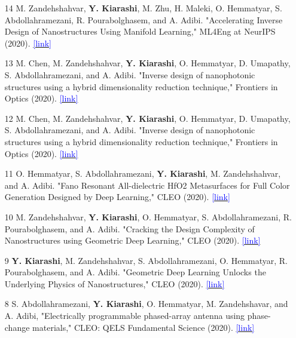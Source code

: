 \documentclass[margin, line]{res}
\newenvironment{list1}{
  \begin{list}{\ding{113}}{%
      \setlength{\itemsep}{0in}
      \setlength{\parsep}{0in} \setlength{\parskip}{0in}
      \setlength{\topsep}{0in} \setlength{\partopsep}{0in} 
      \setlength{\leftmargin}{0.17in}}}{\end{list}}
\begin{document}
\begin{resume}
\begin{list1}
\begin{itemize}
\item [14] M. Zandehshahvar, \textbf{Y. Kiarashi}, M. Zhu, H. Maleki, O. Hemmatyar, S. Abdollahramezani, R. Pourabolghasem, and A. Adibi. "Accelerating Inverse Design of Nanostructures Using Manifold Learning," ML4Eng at NeurIPS (2020). \href{https://ml4eng.github.io/camera_readys/18.pdf}{\textcolor{blue}{[link]}}

\item [13] M. Chen, M. Zandehshahvar, \textbf{Y. Kiarashi}, O. Hemmatyar, D. Umapathy, S. Abdollahramezani,  and A. Adibi. "Inverse design of nanophotonic structures using a hybrid dimensionality reduction technique," Frontiers in Optics (2020). \href{https://opg.optica.org/abstract.cfm?uri=FiO-2020-FM2A.1}{\textcolor{blue}{[link]}}

\item [12] M. Chen, M. Zandehshahvar, \textbf{Y. Kiarashi}, O. Hemmatyar, D. Umapathy, S. Abdollahramezani, and A. Adibi. "Inverse design of nanophotonic structures using a hybrid dimensionality reduction technique," Frontiers in Optics (2020). \href{https://opg.optica.org/abstract.cfm?uri=FiO-2020-FM2A.1}{\textcolor{blue}{[link]}}

\item [11] O. Hemmatyar, S. Abdollahramezani, \textbf{Y. Kiarashi}, M. Zandehshahvar, and A. Adibi. "Fano Resonant All-dielectric HfO2 Metasurfaces for Full Color Generation Designed by Deep Learning," CLEO (2020). \href{https://opg.optica.org/abstract.cfm?uri=CLEO_QELS-2020-JW2D.34}{\textcolor{blue}{[link]}}

\item [10] M. Zandehshahvar, \textbf{Y. Kiarashi}, O. Hemmatyar, S. Abdollahramezani, R. Pourabolghasem, and A. Adibi. "Cracking the Design Complexity of Nanostructures using Geometric Deep Learning," CLEO (2020). \href{https://opg.optica.org/abstract.cfm?uri=CLEO_SI-2020-SF1R.4}{\textcolor{blue}{[link]}}

\item [9] \textbf{Y. Kiarashi}, M. Zandehshahvar, S. Abdollahramezani, O. Hemmatyar, R. Pourabolghasem, and A. Adibi. "Geometric Deep Learning Unlocks the Underlying Physics of Nanostructures," CLEO (2020). \href{https://ieeexplore.ieee.org/document/9193417}{\textcolor{blue}{[link]}}

\item [8] S.  Abdollahramezani, \textbf{Y. Kiarashi}, O. Hemmatyar, M. Zandehshavar, and A. Adibi, "Electrically programmable phased-array antenna using phase-change materials," CLEO: QELS Fundamental Science (2020). \href{https://opg.optica.org/abstract.cfm?uri=CLEO_QELS-2020-FW3Q.5}{\textcolor{blue}{[link]}}


\end{itemize}
\end{list1}
\end{resume}
\end{document}
